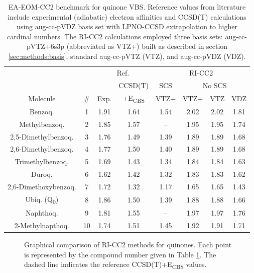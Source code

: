\begin{table}[h!]
  \centering
  \small
  \caption[EA-EOM-CC2 benchmark for quinone VBS.]{EA-EOM-CC2 benchmark for quinone VBS. Reference values from literature\cite{schulz2018systematic} include experimental (adiabatic) electron affinities and CCSD(T) calculations using aug-cc-pVDZ basis set with LPNO-CCSD extrapolation to higher cardinal numbers. The RI-CC2 calculations employed three basis sets: aug-cc-pVTZ+6s3p (abbreviated as VTZ+) built as described in section \ref{sec:methods:basis}, standard aug-cc-pVTZ (VTZ), and aug-cc-pVDZ (VDZ).}
  \label{tab:Quinones}
  \begin{tabular*}{\textwidth}{cccccccc}
  \toprule
   & & \multicolumn{2}{c}{Ref. \cite{schulz2018systematic}} & \multicolumn{4}{c}{RI-CC2}  \\
   \cmidrule(lr){3-4} \cmidrule(lr){5-8}
   & & & CCSD(T) & SCS & \multicolumn{3}{c}{No SCS} \\
  \cmidrule(lr){6-8}
  Molecule & \# & Exp. & +E\textsubscript{CBS} & VTZ+ & VTZ+ & VTZ & VDZ  \\
  \midrule
  Benzoq. & 1  & 1.91 & 1.64 & 1.54 & 2.02 & 2.02 & 1.81 \\
  Methylbenzoq. & 2  & 1.85 & 1.57 &  --  & 1.95 & 1.95 & 1.74 \\
  2,5-Dimethylbenzoq. & 3  & 1.76 & 1.49 & 1.39 & 1.89 & 1.89 & 1.68 \\
  2,6-Dimethylbenzoq. & 4  & 1.77 & 1.50 & 1.40 & 1.89 & 1.89 & 1.68 \\
  Trimethylbenzoq. & 5  & 1.69 & 1.43 & 1.34 & 1.84 & 1.84 & 1.63 \\
  Duroq. & 6  & 1.62 & 1.42 & 1.32 & 1.83 & 1.83 & 1.62 \\
  2,6-Dimethoxybenzoq. & 7  & 1.72 & 1.32 & 1.17 & 1.65 & 1.65 & 1.43 \\
  Ubiq. (Q\textsubscript{0}) & 8  & 1.86 & 1.50 & 1.39 & 1.88 & 1.88 & 1.66 \\
  Naphthoq. & 9  & 1.81 & 1.55 &  --  & 1.97 & 1.97 & 1.76 \\
  2-Methylnapthoq. & 10 & 1.74 & 1.51 & 1.45 & 1.92 & 1.91 & 1.71 \\
  \bottomrule
  \end{tabular*}
\end{table}


\begin{figure}[h!]
  \centering
  \small
  
  \caption{Graphical comparison of RI-CC2 methods for quinones. Each point is represented by the compound number given in Table \ref{tab:Quinones}. The dashed line indicates the reference CCSD(T)+E\textsubscript{CBS} values.}
  \label{fig:Quinones}
\end{figure}
  
